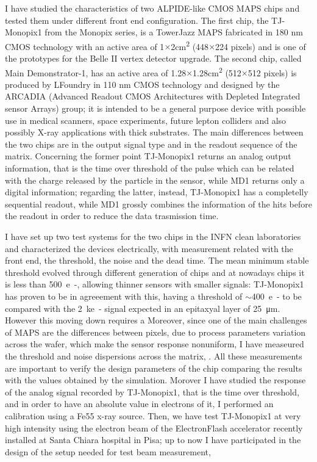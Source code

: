 I have studied the characteristics of two ALPIDE-like CMOS MAPS chips and tested them under different front end configuration. The first chip, the TJ-Monopix1 from the Monopix series, is a TowerJazz MAPS fabricated in 180 nm CMOS technology with an active area of 1$\times$2\si{cm\squared} (448$\times$224 pixels) and is one of the prototypes for the Belle II vertex detector upgrade. The second chip, called Main Demonstrator-1, has an active area of 1.28$\times$1.28\si{cm\squared} (512$\times$512 pixels) is produced by LFoundry in 110 nm CMOS technology and designed by the ARCADIA (Advanced Readout CMOS Architectures with Depleted Integrated sensor Arrays) group; it is intended to be a general purpose device with possible use in medical scanners, space experiments, future lepton colliders and also possibly X-ray applications with thick substrates.  
The main differences between the two chips are in the output signal type and in the readout sequence of the matrix. Concerning the former point TJ-Monopix1 returns an analog output information, that is the time over threshold of the pulse which can be related with the charge released by the particle in the sensor, while MD1 returns only a digital information; regarding the latter, instead, TJ-Monopix1 has a completelly sequential readout, while MD1 grossly combines the information of the hits before the readout in order to reduce the data trasmission time.

I have set up two test systems for the two chips in the INFN clean laboratories and characterized the devices electrically, with measurement related with the front end, the threshold, the noise and the dead time. 
The mean minimum stable threshold evolved through different generation of chips and at nowadays chips it is less than \SI{500}{e-}, allowing thinner sensors with smaller signals: TJ-Monopix1 has proven to be in agreeement with this, having a threshold of $\sim$\SI{400}{e-} to be compared with the \SI{2}{ke-} signal expected in an epitaxyal layer of \SI{25}{\um}. However this moving down requires a 
Moreover, since one of the main challenges of MAPS are the differences between pixels, due to process parameters variation across the wafer, which make the sensor response nonuniform, I have measeured the threshold and noise dispersions across the matrix, .
All these measurements are important to verify the design parameters of the chip comparing the results with the values obtained by the simulation. 
Morover I have studied the response of the analog signal recorded by TJ-Monopix1, that is the time over threshold, and in order to have an absolute value in electrons of it, I performed an calibration using a Fe55 x-ray source.
Then, we have test TJ-Monopix1 at very high intensity using the electron beam of the ElectronFlash accelerator recently installed at Santa Chiara hospital in Pisa; up to now I have participated in the design of the setup needed for test beam measurement, 

